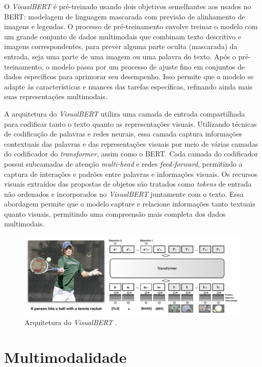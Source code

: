 O \textit{VisualBERT} é pré-treinado usando dois objetivos semelhantes aos usados no BERT: modelagem de linguagem mascarada com previsão de alinhamento de imagens e legendas. O processo de pré-treinamento envolve treinar o modelo com um grande conjunto de dados multimodais que combinam texto descritivo e imagens correspondentes, para prever alguma parte oculta (mascarada) da entrada, seja uma parte de uma imagem ou uma palavra do texto. Após o pré-treinamento, o modelo passa por um processo de ajuste fino em conjuntos de dados específicos para aprimorar seu desempenho. Isso permite que o modelo se adapte às características e nuances das tarefas específicas, refinando ainda mais suas representações multimodais.

A arquitetura do \textit{VisualBERT} utiliza uma camada de entrada compartilhada para codificar tanto o texto quanto as representações visuais. Utilizando técnicas de codificação de palavras e redes neurais, essa camada captura informações contextuais das palavras e das representações visuais por meio de várias camadas do codificador do \textit{transformer}, assim como o BERT. Cada camada do codificador possui subcamadas de atenção \textit{multi-head} e redes \textit{feed-forward}, permitindo a captura de interações e padrões entre palavras e informações visuais. Os recursos visuais extraídos das propostas de objetos são tratados como \textit{tokens} de entrada não ordenados e incorporados no \textit{VisualBERT} juntamente com o texto. Essa abordagem permite que o modelo capture e relacione informações tanto textuais quanto visuais, permitindo uma compreensão mais completa dos dados multimodais.

\begin{figure}[!htbp]
	\centering
	\includegraphics[scale=0.35]{imagens/visualBERT.png}
    \caption {Arquitetura do \textit{VisualBERT} \cite{VisualBERTArt}.}
\end{figure}

\section{Multimodalidade}

